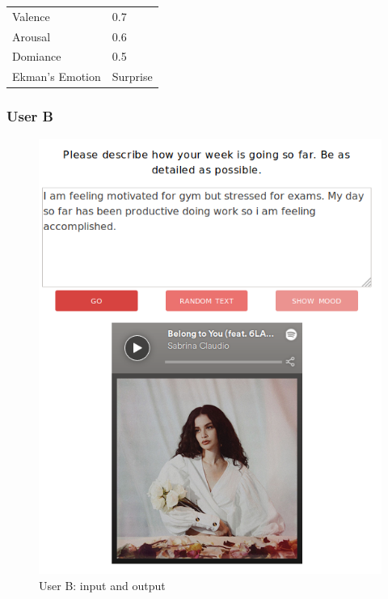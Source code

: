 \begin{table}[h]
\centering
\begin{tabular}{|l|l|}
\hline
 Valence &  0.7\\
 Arousal &  0.6\\
 Domiance &  0.5\\
 Ekman's Emotion &  Surprise\\ \hline
\end{tabular}
\end{table}

\pagebreak

\subsubsection{User B}

\begin{figure}[h]
\centering
\includegraphics[scale=0.4]{implementation/jana.png}
\caption{User B: input and output}
\label{user:2}
\end{figure}

